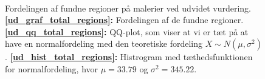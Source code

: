 {\begin{figure}[!h]
    \centering
    \\
    \caption[]{Fordelingen af fundne regioner på malerier ved udvidet
    vurdering.
    \textbf{\ref{ud_graf_total_regions}:} Fordelingen af de fundne
    regioner.
    \textbf{\ref{ud_qq_total_regions}:} QQ-plot, som viser at vi er tæt
    på at have en normalfordeling med den teoretiske fordeling $X \sim N(\mu,
    \sigma^2)$.
    \textbf{\ref{ud_hist_total_regions}:} Histrogram med
    tæthedsfunktionen for normalfordeling, hvor $\mu = 33.79$ og
    $\sigma^2 = 345.22$.
    }
    \label{ud_total_regions_plots}
\end{figure}

}
